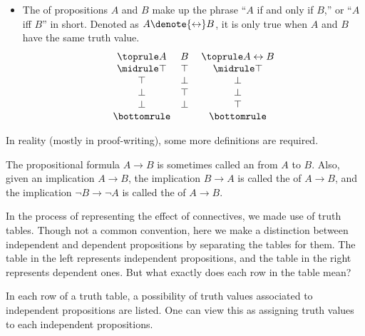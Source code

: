 \begin{itemize}
    \item The  of propositions \(A\) and \(B\)
    make up the phrase ``\(A\) if and only if \(B\),''
    or ``\(A\) iff \(B\)'' in short.
    Denoted as \(A\denote{\leftrightarrow}B\),
    it is only true when \(A\) and \(B\) have the same truth value.
    \[
        \begin{array}{c c} \toprule
            A & B \\ \midrule
            \top & \top \\
            \top & \bot \\
            \bot & \top \\
            \bot & \bot \\ \bottomrule            
        \end{array}
        \;
        \begin{array}{c} \toprule
            A\leftrightarrow B \\ \midrule
            \top \\
            \bot \\
            \bot \\
            \top \\ \bottomrule            
        \end{array}
    \]
\end{itemize}

In reality (mostly in proof-writing),
some more definitions are required.

\begin{definition}[Conditionals]
    \label{def:conditional}
    The propositional formula \(A\to B\)
    is sometimes called an  from \(A\) to \(B\).
    Also, given an implication \(A\to B\),
    the implication \(B\to A\) is called
    the  of \(A\to B\),
    and the implication \(\neg B\to\neg A\) is called
    the  of \(A\to B\).
\end{definition}

In the process of representing the effect of connectives,
we made use of truth tables.
Though not a common convention,
here we make a distinction between
independent and dependent propositions
by separating the tables for them.
The table in the left represents independent propositions,
and the table in the right represents dependent ones.
But what exactly does each row in the table mean?

In each row of a truth table,
a possibility of truth values associated to independent propositions
are listed.
One can view this as assigning truth values
to each independent propositions.

